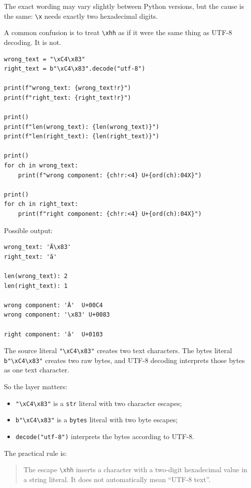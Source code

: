 The exact wording may vary slightly between Python versions, but the cause is the same: \texttt{\textbackslash x} needs exactly two hexadecimal digits.

A common confusion is to treat \texttt{\textbackslash xhh} as if it were the same thing as UTF-8 decoding. It is not.

\begin{verbatim}
wrong_text = "\xC4\x83"
right_text = b"\xC4\x83".decode("utf-8")

print(f"wrong_text: {wrong_text!r}")
print(f"right_text: {right_text!r}")

print()
print(f"len(wrong_text): {len(wrong_text)}")
print(f"len(right_text): {len(right_text)}")

print()
for ch in wrong_text:
    print(f"wrong component: {ch!r:<4} U+{ord(ch):04X}")

print()
for ch in right_text:
    print(f"right component: {ch!r:<4} U+{ord(ch):04X}")
\end{verbatim}

Possible output:

\begin{verbatim}
wrong_text: 'Ä\x83'
right_text: 'ă'

len(wrong_text): 2
len(right_text): 1

wrong component: 'Ä'  U+00C4
wrong component: '\x83' U+0083

right component: 'ă'  U+0103
\end{verbatim}

The source literal \texttt{"\textbackslash xC4\textbackslash x83"} creates two text characters. The bytes literal \texttt{b"\textbackslash xC4\textbackslash x83"} creates two raw bytes, and UTF-8 decoding interprets those bytes as one text character.

So the layer matters:

\begin{itemize}
    \item \texttt{"\textbackslash xC4\textbackslash x83"} is a \texttt{str} literal with two character escapes;
    \item \texttt{b"\textbackslash xC4\textbackslash x83"} is a \texttt{bytes} literal with two byte escapes;
    \item \texttt{decode("utf-8")} interprets the bytes according to UTF-8.
\end{itemize}

The practical rule is:

\begin{quote}
The escape \texttt{\textbackslash xhh} inserts a character with a two-digit hexadecimal value in a string literal. It does not automatically mean ``UTF-8 text''.
\end{quote}


